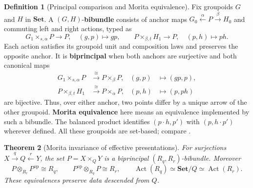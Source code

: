 \documentclass[11pt,a4paper]{article}
\numberwithin{equation}{section}
\newtheorem{theorem}{Theorem}[section]
\theoremstyle{definition}
\newtheorem{definition}[theorem]{Definition}
\theoremstyle{remark}
\theoremstyle{plain}
\begin{document}
\begin{definition}[Principal comparison and Morita equivalence]
\label{def:egt-principal-comparison-and-morita-equivalence}
Fix groupoids $G$ and $H$ in $\mathbf{Set}$. A
$(G,H)$-\textbf{bibundle} consists of anchor maps
$G_0\xleftarrow{\alpha}P\xrightarrow{\beta}H_0$ and commuting
left and right actions, typed as
\[
 G_1\times_{s,\alpha}P\longrightarrow P,\quad(g,p)\mapsto gp,
 \qquad
 P\times_{\beta,t}H_1\longrightarrow P,\quad(p,h)\mapsto ph.
\]
Each action satisfies its groupoid unit and composition laws and
preserves the opposite anchor. It is \textbf{biprincipal} when both
anchors are surjective and both canonical maps
\[
 \begin{aligned}
 G_1\times_{s,\alpha}P&\xrightarrow{\ \cong\ }P\times_{\beta}P,
   &(g,p)&\longmapsto(gp,p),\\
 P\times_{\beta,t}H_1&\xrightarrow{\ \cong\ }P\times_{\alpha}P,
   &(p,h)&\longmapsto(p,ph)
 \end{aligned}
\]
are bijective. Thus, over either anchor, two points differ by a unique
arrow of the other groupoid. \textbf{Morita equivalence} here means an
equivalence implemented by such a bibundle. The balanced product
identifies $(p\cdot h,p')$ with $(p,h\cdot p')$ wherever defined.
All these groupoids are set-based; compare \citet{Landsman2001}.
\end{definition}
\begin{theorem}[Morita invariance of effective presentations]
\label{thm:egt-morita-presentations}
For surjections $X\xrightarrow qQ\xleftarrow rY$, the set
$P=X\times_QY$ is a biprincipal $(R_q,R_r)$-bibundle. Moreover
\[
 P\otimes_{R_r}P^{\mathrm{op}}\cong R_q,
 \qquad
 P^{\mathrm{op}}\otimes_{R_q}P\cong R_r,
 \qquad
 \operatorname{Act}(R_q)\simeq\mathbf{Set}/Q
 \simeq\operatorname{Act}(R_r).
\]
These equivalences preserve data descended from $Q$.
\end{theorem}
\end{document}
